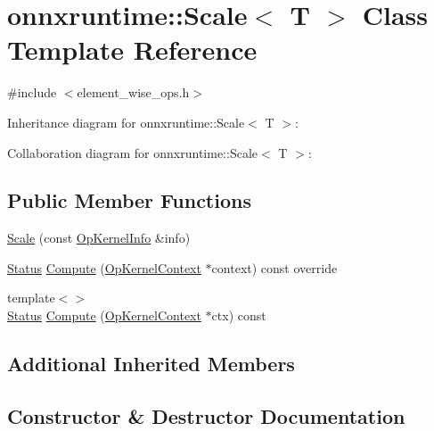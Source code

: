 \hypertarget{classonnxruntime_1_1Scale}{}\section{onnxruntime\+:\+:Scale$<$ T $>$ Class Template Reference}
\label{classonnxruntime_1_1Scale}


{\ttfamily \#include $<$element\+\_\+wise\+\_\+ops.\+h$>$}



Inheritance diagram for onnxruntime\+:\+:Scale$<$ T $>$\+:


Collaboration diagram for onnxruntime\+:\+:Scale$<$ T $>$\+:
\subsection*{Public Member Functions}
\begin{DoxyCompactItemize}
\item 
\mbox{\hyperlink{classonnxruntime_1_1Scale_abacc308adf1dd9e46612905301b787d2}{Scale}} (const \mbox{\hyperlink{classonnxruntime_1_1OpKernelInfo}{Op\+Kernel\+Info}} \&info)
\item 
\mbox{\hyperlink{classonnxruntime_1_1common_1_1Status}{Status}} \mbox{\hyperlink{classonnxruntime_1_1Scale_ac056b024b0352a740117ddeb321c8265}{Compute}} (\mbox{\hyperlink{classonnxruntime_1_1OpKernelContext}{Op\+Kernel\+Context}} $\ast$context) const override
\item 
{\footnotesize template$<$$>$ }\\\mbox{\hyperlink{classonnxruntime_1_1common_1_1Status}{Status}} \mbox{\hyperlink{classonnxruntime_1_1Scale_a4ff83bb8c20768c848df0c457f190f58}{Compute}} (\mbox{\hyperlink{classonnxruntime_1_1OpKernelContext}{Op\+Kernel\+Context}} $\ast$ctx) const
\end{DoxyCompactItemize}
\subsection*{Additional Inherited Members}


\subsection{Constructor \& Destructor Documentation}
\mbox{\label{classonnxruntime_1_1Scale_abacc308adf1dd9e46612905301b787d2}} 
